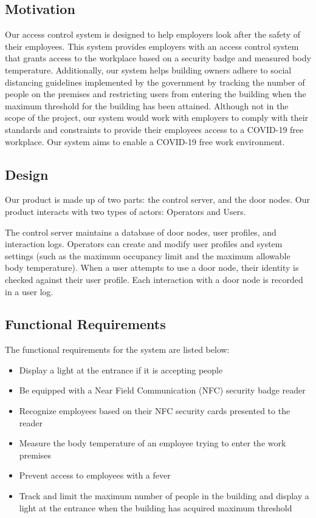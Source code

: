 
\subsection{Motivation}

Our access control system is designed to help employers look after the safety
of their employees.  This system provides employers with an access control
system that grants access to the workplace based on a security badge and
measured body temperature.  Additionally, our system helps building owners
adhere to social distancing guidelines implemented by the government by
tracking the number of people on the premises and restricting users from
entering the building when the maximum threshold for the building has been
attained.  Although not in the scope of the project, our system would work with
employers to comply with their standards and constraints to provide their
employees access to a COVID-19 free workplace.  Our system aims to enable a
COVID-19 free work environment.


\subsection{Design}

Our product is made up of two parts: the control server, and the door nodes.
Our product interacts with two types of actors: Operators and Users.


The control server maintains a database of door nodes, user profiles, and
interaction logs.  Operators can create and modify user profiles and system
settings (such as the maximum occupancy limit and the maximum allowable body
temperature).  When a user attempts to use a door node, their identity is
checked against their user profile.  Each interaction with a door node is
recorded in a user log.

\subsection{Functional Requirements}

The  functional requirements for the system are listed below:

\begin{itemize}
	\item Display a  light at the entrance if it is accepting people
	\item Be equipped with a Near Field Communication (NFC) security badge
	reader
	\item Recognize employees based on their NFC security cards presented to
	the reader 
	\item Measure the body temperature of an employee trying to enter the work
	premises 
	\item Prevent access to employees with a fever
	\item Track and limit the maximum number of people in the building and display a
	light at the entrance when the building has acquired maximum threshold
\end{itemize}
